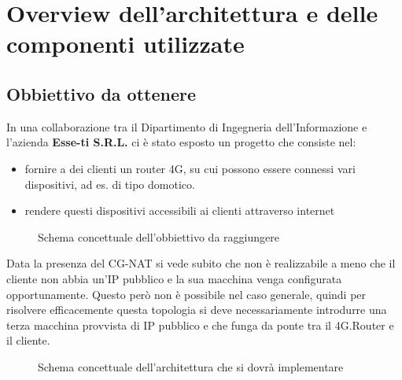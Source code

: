 

\chapter{Overview dell'architettura e delle componenti utilizzate}
\setlength{\parskip}{1em}
\setlength{\parindent}{0em}
\renewcommand{\baselinestretch}{1.15}

\label{ch:1}

\section{Obbiettivo da ottenere}

In una collaborazione tra il Dipartimento di Ingegneria dell'Informazione e l'azienda \textbf{Esse-ti S.R.L.} ci \`e stato esposto un progetto che consiste nel:

\begin{itemize}
    \item fornire a dei clienti un router 4G, su cui possono essere connessi vari dispositivi, ad es. di tipo domotico.
    \item rendere questi dispositivi accessibili ai clienti attraverso internet 
\end{itemize}

\begin{figure}[ht]
	\centering
	
	\caption{Schema concettuale dell'obbiettivo da raggiungere}

	
\end{figure}

Data la presenza del CG-NAT si vede subito che non \`e realizzabile a meno che il cliente non abbia un'IP pubblico e la sua macchina venga configurata opportunamente. Questo per\`o non \`e possibile nel caso generale, quindi per risolvere efficacemente questa topologia si deve necessariamente introdurre una terza macchina provvista di IP pubblico e che funga da ponte tra il 4G.Router e il cliente.

\begin{figure}[ht]
	\centering
	
	\caption{Schema concettuale dell'architettura che si dovr\`a implementare}

	
\end{figure}

